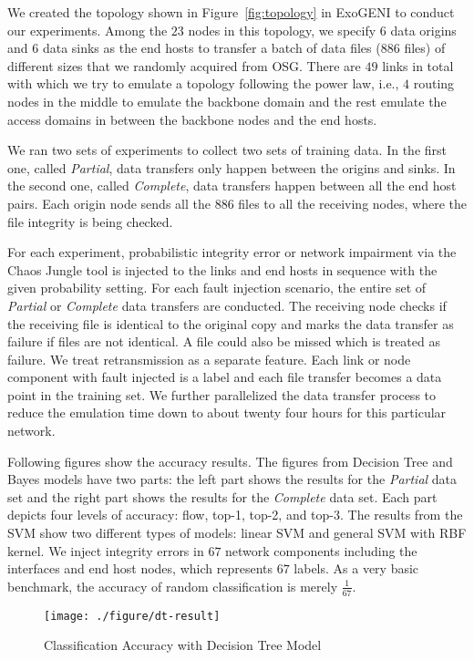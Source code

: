 We created the topology shown in Figure~\ref{fig:topology} in ExoGENI to conduct our experiments. Among the $23$ nodes in this topology, we specify $6$ data origins and $6$ data sinks as the end hosts to transfer a batch of data files ($886$ files) of different sizes that we randomly acquired from OSG. There are $49$ links in total with which we try to emulate a topology following the power law, i.e., $4$ routing nodes in the middle to emulate the backbone domain and the rest emulate the access domains in between the backbone nodes and the end hosts. 

We ran two sets of experiments to collect two sets of training data. In the first one, called {\it Partial},
data transfers only happen between the origins and sinks. In the second one, called {\it Complete}, 
data transfers happen between all the end host pairs. Each origin node sends all the $886$ files to all the receiving nodes, where the file integrity is being checked.

For each experiment, probabilistic integrity error or network impairment via the Chaos Jungle tool is injected to the links and end hosts in sequence with the given probability setting. For each fault injection scenario, the entire set of {\it Partial} or {\it Complete} data transfers are conducted. The receiving node checks if the receiving file is identical to the original copy and marks the data transfer as failure if files are not identical. A file could also be missed which is treated as failure. We treat retransmission as a separate feature. Each link or node component with fault injected is a label and each file transfer becomes a data point in the training set. We further parallelized the data transfer process to reduce the emulation time down to about twenty four hours for this particular network. 

Following figures show the accuracy results. The figures from Decision Tree and Bayes models have two parts: the left part shows the results for the {\it Partial} data set and the right part shows the results for the {\it Complete} data set. Each part depicts four levels of accuracy: flow, top-1, top-2, and top-3. The results from the SVM show two different types of models: linear SVM and general SVM with RBF kernel.
We inject integrity errors in $67$ network components including the interfaces and end host nodes, which represents $67$ labels. As a very basic benchmark, the accuracy of random classification is merely $\frac{1}{67}$.
\begin{figure}[!ht]
\begin{center}
\texttt{[image: ./figure/dt-result]}
\end{center}
\vspace{-0.05in}
\caption{Classification Accuracy with Decision Tree Model}
\vspace{-0.05in}
\label{fig:dt}
\end{figure}

